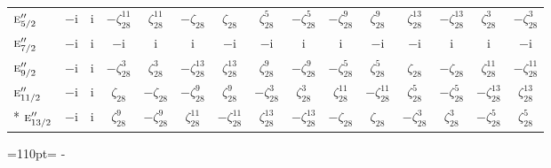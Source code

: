 \documentclass[10pt,a4paper]{article}
\newcommand{\needspace}[1]{\par\penalty-100\begingroup\dimen0=#1\relax\dimen2=\pagegoal
  \advance\dimen2-\pagetotal\ifdim\dimen0>\dimen2\relax\ifdim\dimen2>0pt\vfil\break\fi\fi
  \endgroup}
\numberwithin{equation}{section}
\newcommand{\irr}[1]{\text{\normalfont\scshape #1}}
\newcommand{\iunit}{\mathrm{i}}
\newcommand{\rootunity}[1]{\zeta_{#1}}
\begin{document}
{\begin{longtable}{@{}lcccccccccccccc@{}}
$\irr{e}_{5/2}''$ & $-\iunit{}$ & $\iunit{}$ & $-\rootunity{28}^{11}$ & $\rootunity{28}^{11}$ & $-\rootunity{28}$ & $\rootunity{28}$ & $\rootunity{28}^{5}$ & $-\rootunity{28}^{5}$ & $-\rootunity{28}^{9}$ & $\rootunity{28}^{9}$ & $\rootunity{28}^{13}$ & $-\rootunity{28}^{13}$ & $\rootunity{28}^{3}$ & $-\rootunity{28}^{3}$\\
$\irr{e}_{7/2}''$ & $-\iunit{}$ & $\iunit{}$ & $-\iunit{}$ & $\iunit{}$ & $\iunit{}$ & $-\iunit{}$ & $-\iunit{}$ & $\iunit{}$ & $\iunit{}$ & $-\iunit{}$ & $-\iunit{}$ & $\iunit{}$ & $\iunit{}$ & $-\iunit{}$\\
$\irr{e}_{9/2}''$ & $-\iunit{}$ & $\iunit{}$ & $-\rootunity{28}^{3}$ & $\rootunity{28}^{3}$ & $-\rootunity{28}^{13}$ & $\rootunity{28}^{13}$ & $\rootunity{28}^{9}$ & $-\rootunity{28}^{9}$ & $-\rootunity{28}^{5}$ & $\rootunity{28}^{5}$ & $\rootunity{28}$ & $-\rootunity{28}$ & $\rootunity{28}^{11}$ & $-\rootunity{28}^{11}$\\
$\irr{e}_{11/2}''$ & $-\iunit{}$ & $\iunit{}$ & $\rootunity{28}$ & $-\rootunity{28}$ & $-\rootunity{28}^{9}$ & $\rootunity{28}^{9}$ & $-\rootunity{28}^{3}$ & $\rootunity{28}^{3}$ & $\rootunity{28}^{11}$ & $-\rootunity{28}^{11}$ & $\rootunity{28}^{5}$ & $-\rootunity{28}^{5}$ & $-\rootunity{28}^{13}$ & $\rootunity{28}^{13}$\\*
$\irr{e}_{13/2}''$ & $-\iunit{}$ & $\iunit{}$ & $\rootunity{28}^{9}$ & $-\rootunity{28}^{9}$ & $\rootunity{28}^{11}$ & $-\rootunity{28}^{11}$ & $\rootunity{28}^{13}$ & $-\rootunity{28}^{13}$ & $-\rootunity{28}$ & $\rootunity{28}$ & $-\rootunity{28}^{3}$ & $\rootunity{28}^{3}$ & $-\rootunity{28}^{5}$ & $\rootunity{28}^{5}$\\
\bottomrule\end{longtable}}
\needspace{110pt}
\end{document}
